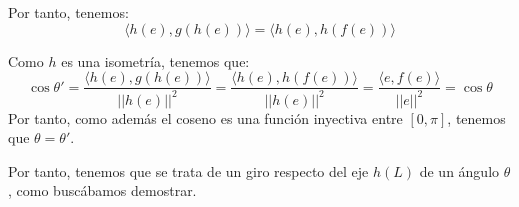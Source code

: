 \begin{ejercicio}
    Por tanto, tenemos:
    \begin{equation*}
        \langle h(e), g(h(e))\rangle = \langle h(e), h(f(e))\rangle
    \end{equation*}

    Como $h$ es una isometría, tenemos que:
    \begin{equation*}
        \cos \theta ' = \frac{\langle h(e), g(h(e))\rangle}{||h(e)||^2 }
        = \frac{\langle h(e), h(f(e))\rangle}{||h(e)||^2 }
        = \frac{\langle e, f(e)\rangle}{||e||^2 } = \cos \theta
    \end{equation*}
    Por tanto, como además el coseno es una función inyectiva entre $[0,\pi]$, tenemos que $\theta = \theta'$.

    Por tanto, tenemos que se trata de un giro respecto del eje $h(L)$ de un ángulo $\theta$, como buscábamos demostrar.
\end{ejercicio}


